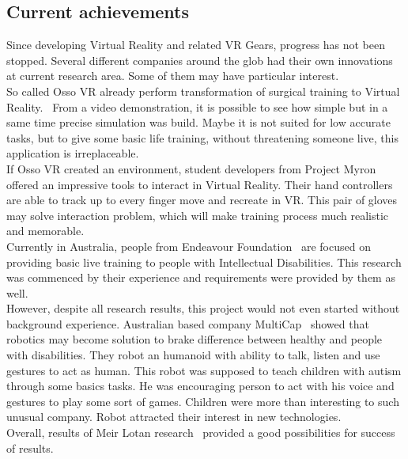 \documentclass[18pt]{article}
\numberwithin{equation}{section} %
\numberwithin{figure}{section} %
\numberwithin{table}{section} %
\begin{document}
	\subsection{Current achievements}		
		Since developing Virtual Reality and related VR Gears, progress has not been stopped. Several different companies around the glob had their own innovations at current research area. Some of them may have particular interest. \\
		So called Osso VR already perform transformation of surgical training to Virtual Reality.~\cite{OssoVR} From a video demonstration, it is possible to see how simple but in a same time precise simulation was build. Maybe it is not suited for low accurate tasks, but to give some basic life training, without threatening someone live, this application is irreplaceable. \\	
		If Osso VR created an environment, student developers from Project Myron~\cite{Myron} offered an impressive tools to interact in Virtual Reality. Their hand controllers are able to track up to every finger move and recreate in VR. This pair of gloves may solve interaction problem, which will make training process much realistic and memorable. \\
		Currently in Australia, people from Endeavour Foundation~\cite{Endeav} are focused on providing basic live training to people with Intellectual Disabilities. This research was commenced by their experience and requirements were provided by them as well. \\
		
		However, despite all research results, this project would not even started without background experience. Australian based company MultiCap~\cite{Multicap} showed that robotics may become solution to brake difference between healthy and people with disabilities. They robot an humanoid with ability to talk, listen and use gestures to act as human. This robot was supposed to teach children with autism through some basics tasks. He was encouraging person to act with his voice and gestures to play some sort of games. Children were more than interesting to such unusual company. Robot attracted their interest in new technologies. \\		
		Overall, results of Meir Lotan research~\cite{LOTAN2009229} provided a good possibilities for success of results.\\	
	
\end{document}
